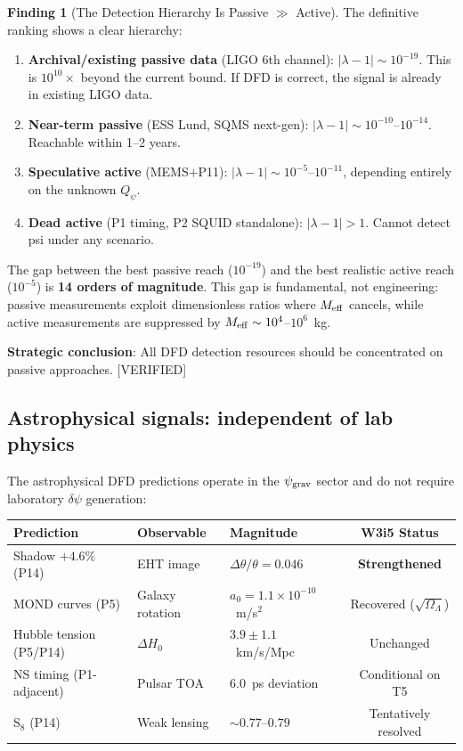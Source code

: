 \documentclass[11pt]{article}
\newcommand{\dpsi}{\delta\psi}
\newcommand{\lam}{\lambda}
\newcommand{\Meff}{M_{\rm eff}}
\newcommand{\ee}[1]{\times 10^{#1}}
\newcommand{\Qpsi}{Q_\psi}
\newcommand{\lbone}{|\lam - 1|}
\newcommand{\psigrav}{\psi_{\rm grav}}
\theoremstyle{definition}
\newtheorem{finding}[theorem]{Finding}
\theoremstyle{remark}
\begin{document}
\begin{finding}[The Detection Hierarchy Is Passive $\gg$ Active]
\label{find:hierarchy}
The definitive ranking shows a clear hierarchy:
\begin{enumerate}[nosep]
\item \textbf{Archival/existing passive data} (LIGO 6th channel):
  $\lbone \sim 10^{-19}$. This is $10^{10}\times$ beyond the current bound.
  If DFD is correct, the signal is already in existing LIGO data.
\item \textbf{Near-term passive} (ESS Lund, SQMS next-gen):
  $\lbone \sim 10^{-10}$--$10^{-14}$. Reachable within 1--2 years.
\item \textbf{Speculative active} (MEMS+P11):
  $\lbone \sim 10^{-5}$--$10^{-11}$, depending entirely on the unknown
  $\Qpsi$.
\item \textbf{Dead active} (P1 timing, P2 SQUID standalone):
  $\lbone > 1$. Cannot detect psi under any scenario.
\end{enumerate}

The gap between the best passive reach ($10^{-19}$) and the best
realistic active reach ($10^{-5}$) is \textbf{14 orders of magnitude}.
This gap is fundamental, not engineering: passive measurements exploit
dimensionless ratios where $\Meff$ cancels, while active measurements
are suppressed by $\Meff \sim 10^{4}$--$10^{6}$~kg.

\textbf{Strategic conclusion}: All DFD detection resources should be
concentrated on passive approaches. [VERIFIED]
\end{finding}

\subsection{Astrophysical signals: independent of lab physics}
\label{ssec:astro_signals}

The astrophysical DFD predictions operate in the $\psigrav$ sector
and do not require laboratory $\dpsi$ generation:

\begin{center}
\renewcommand{\arraystretch}{1.2}
\begin{tabular}{@{}lllc@{}}
\toprule
\textbf{Prediction} & \textbf{Observable} & \textbf{Magnitude} &
  \textbf{W3i5 Status} \\
\midrule
Shadow $+4.6\%$ (P14) & EHT image & $\Delta\theta/\theta = 0.046$
  & \textbf{Strengthened} \\
MOND curves (P5) & Galaxy rotation & $a_0 = 1.1\ee{-10}$~m/s$^2$
  & Recovered ($\sqrt{\Omega_\Lambda}$) \\
Hubble tension (P5/P14) & $\Delta H_0$ & $3.9 \pm 1.1$~km/s/Mpc
  & Unchanged \\
NS timing (P1-adjacent) & Pulsar TOA & 6.0~ps deviation
  & Conditional on T5 \\
S$_8$ (P14) & Weak lensing & $\sim 0.77$--$0.79$
  & Tentatively resolved \\
\bottomrule
\end{tabular}
\end{center}
\end{document}
